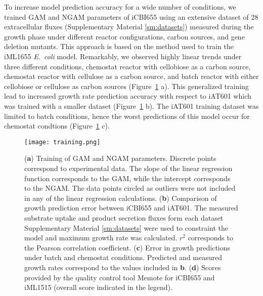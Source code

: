 To increase model prediction accuracy for a wide number of conditions, we trained GAM and NGAM parameters of iCBI655 using an extensive dataset of 28 extracellular fluxes (Supplementary Material \ref{sm:datasets}) measured during the
growth phase under different reactor configurations, carbon sources, and gene deletion mutants. This approach is based on the method used to train the iML1655 \textit{E.~coli} model. \citep{monk2017}
Remarkably, we observed highly linear trends under three different conditions, chemostat reactor with cellobiose as a carbon source, chemostat reactor with cellulose as a carbon source, and batch reactor with either cellobiose or cellulose as carbon sources (Figure~\ref{fig6:training} a). This generalized training lead to increased growth rate prediction accuracy with respect to iAT601 which was trained with a smaller dataset (Figure~\ref{fig6:training} b). The iAT601 training dataset was limited to batch conditions, hence the worst predictions of this model occur for chemostat condtions (Figure~\ref{fig6:training} c).

\begin{figure}[hp]
    \centering
    \texttt{[image: training.png]}
    \caption[Training of iCBI655 model]{%
        (\textbf{a}) Training of GAM and NGAM parameters. Discrete points correspond to experimental data.
    The slope of the linear regression function corresponds to the GAM, while the intercept corresponds to the NGAM.
    The data points circled as outliers were not included in any of the linear regression calculations. (\textbf{b}) Comparison of growth prediction error between iCBI655 and iAT601.
    The measured substrate uptake and product secretion fluxes form each dataset Supplementary Material \ref{sm:datasets} were used to constraint the model and maximum growth rate was calculated.
    $r^2$ corresponds to the Pearson correlation coefficient.
    (\textbf{c}) Error in growth predictions under batch and chemostat conditions.
    Predicted and measured growth rates correspond to the values included in \textbf{b}. (\textbf{d}) Scores provided by the quality control tool Memote\citep{lieven2018} for iCBI655 and iML1515 (overall score indicated in the legend).}
   \label{fig6:training}
\end{figure}


